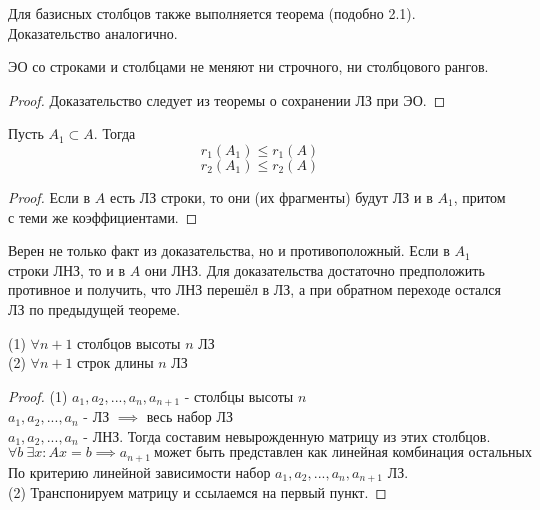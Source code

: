 \documentclass[11pt]{article}
\begin{document}
\begin{remark}
    Для базисных столбцов также выполняется теорема (подобно 2.1). Доказательство аналогично.
\end{remark}

\begin{theorem}
    ЭО со строками и столбцами не меняют ни строчного, ни столбцового рангов. 
\end{theorem}

\begin{proof}
    Доказательство следует из теоремы о сохранении ЛЗ при ЭО.
\end{proof}

\begin{theorem}
    Пусть $A_1 \subset A$. Тогда \[r_1(A_1) \leq r_1(A)\] \[r_2(A_1) \leq r_2(A)\]
\end{theorem}

\begin{proof}
    Если в $A$ есть ЛЗ строки, то они (их фрагменты) будут ЛЗ и в $A_1$, притом с теми 
    же коэффициентами.
\end{proof}

\begin{remark}
    Верен не только факт из доказательства, но и противоположный. Если в $A_1$ строки 
    ЛНЗ, то и в $A$ они ЛНЗ. Для доказательства достаточно предположить противное и 
    получить, что ЛНЗ перешёл в ЛЗ, а при обратном переходе остался ЛЗ по предыдущей 
    теореме. 
\end{remark}

\begin{theorem}
    (1) $\forall n + 1$ столбцов высоты $n$ ЛЗ \\
    (2) $\forall n + 1$ строк длины $n$ ЛЗ
\end{theorem}

\begin{proof}
    (1) $a_1, a_2, ..., a_n, a_{n + 1}$ - столбцы высоты $n$ \\
    $a_1, a_2, ..., a_n$ - ЛЗ $\implies$ весь набор ЛЗ \\
    $a_1, a_2, ..., a_n$ - ЛНЗ. Тогда составим невырожденную матрицу из этих столбцов. \\
    \[\forall b \ \exists x: Ax = b \implies a_{n + 1} \ \text{может быть представлен как 
    линейная комбинация остальных}\] По критерию линейной зависимости набор $a_1, a_2, 
    ..., a_n, a_{n + 1}$ ЛЗ. \\
    (2) Транспонируем матрицу и ссылаемся на первый пункт.
\end{proof}
\end{document}
